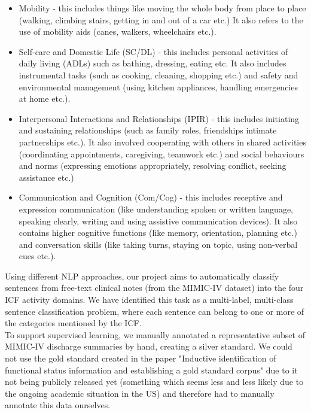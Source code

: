 \begin{itemize}
    \item Mobility - this includes things like moving the whole body from place to place (walking, climbing stairs, getting in and out of a car etc.) It also refers to the use of mobility aids (canes, walkers, wheelchairs etc.).
    \item Self-care and Domestic Life (SC/DL) - this includes personal activities of daily living (ADLs) such as bathing, dressing, eating etc. It also includes instrumental tasks (such as cooking, cleaning, shopping etc.) and safety and environmental management (using kitchen appliances, handling emergencies at home etc.).
    \item Interpersonal Interactions and Relationships (IPIR) - this includes initiating and sustaining relationships (such as family roles, friendships intimate partnerships etc.). It also involved cooperating with others in shared activities (coordinating appointments, caregiving, teamwork etc.) and social behaviours and norms (expressing emotions appropriately, resolving conflict, seeking assistance etc.)
    \item Communication and Cognition (Com/Cog) - this includes receptive and expression communication (like understanding spoken or written language, speaking clearly, writing and using assistive communication devices). It also contains higher cognitive functions (like memory, orientation, planning etc.) and conversation skills (like taking turns, staying on topic, using non-verbal cues etc.).
\end{itemize}

Using different NLP approaches, our project aims to automatically classify sentences from free-text clinical notes (from the MIMIC-IV dataset) into the four ICF activity domains. We have identified this task as a multi-label, multi-class sentence classification problem, where each sentence can belong to one or more of the categories mentioned by the ICF. \\

To support supervised learning, we manually annotated a representative subset of MIMIC-IV discharge summaries by hand, creating a silver standard. We could not use the gold standard created in the paper "Inductive identification of functional status information and establishing a gold
standard corpus" \cite{thieu2017} due to it not being publicly released yet (something which seems less and less likely due to the ongoing academic situation in the US) and therefore had to manually annotate this data ourselves. \\

